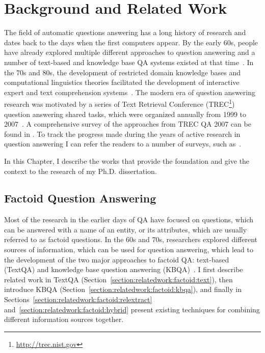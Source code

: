 \chapter{Background and Related Work}
\label{chapter:related}


The field of automatic questions answering has a long history of research and dates back to the days when the first computers appear.
By the early 60s, people have already explored multiple different approaches to question answering and a number of text-based and knowledge base QA systems existed at that time~\cite{Simmons:1965:AEQ:363707.363732,Simmons:1970:NLQ:361953.361963}.
In the 70s and 80s, the development of restricted domain knowledge bases and computational linguistics theories facilitated the development of interactive expert and text comprehension systems~\cite{androutsopoulos1995natural,shortliffe1975model,wilensky1988berkeley,woods1977lunar}.
The modern era of question answering research was motivated by a series of Text Retrieval Conference (TREC\footnote{\href{url}{http://trec.nist.gov}}) question answering shared tasks, which were organized annually from 1999 to 2007~\cite{voorhees2001trec}.
A comprehensive survey of the approaches from TREC QA 2007 can be found in \cite{dang2007overview}.
To track the progress made during the years of active research in question answering I can refer the readers to a number of surveys, such as~\cite{allam2012question,andrenucci2005automated,gupta2012survey,hirschman2001natural,Kolomiyets:2011:SQA:2046840.2047162,prager2006open,wang2006survey}.

In this Chapter, I describe the works that provide the foundation and give the context to the research of my Ph.D. dissertation.

\section{Factoid Question Answering}
\label{section:relatedwork:factoid}

Most of the research in the earlier days of QA have focused on questions, which can be answered with a name of an entity, or its attributes, which are usually referred to as factoid questions.
In the 60s and 70s, researchers explored different sources of information, which can be used for question answering, which lead to the development of the two major approaches to factoid QA: text-based (TextQA) and knowledge base question answering (KBQA)~\cite{Simmons:1965:AEQ:363707.363732}.
I first describe related work in TextQA (Section~\ref{section:relatedwork:factoid:text}), then introduce KBQA (Section~\ref{section:relatedwork:factoid:kbqa}), and finally in Sections~\ref{section:relatedwork:factoid:relextract} and~\ref{section:relatedwork:factoid:hybrid} present existing techniques for combining different information sources together.

